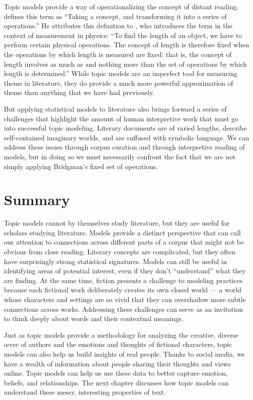 Topic models provide a way of operationalizing the concept of distant reading.
\citet{moretti2013operationalizing} defines this term as ``Taking a concept, and transforming it into a series of operations.''
He attributes this definition to \citet{bridgman1927logic},  who introduces the term in the context of measurement in physics: ``To find the length of an object, we have to perform certain physical operations. The concept of length is therefore fixed when the operations by which length is measured are fixed: that is, the concept of length involves as much as and nothing more than the set of operations by which length is determined.''
While topic models are an imperfect tool for measuring theme in literature, they do provide a much more powerful approximation of theme than anything that we have had previously.

But applying statistical models to literature also brings forward a series of challenges that highlight the amount of human interpretive work that must go into successful topic modeling.
Literary documents are of varied lengths, describe self-contained imaginary worlds, and are suffused with symbolic language.
We can address these issues through corpus curation and through interpretive reading of models, but in doing so we must necessarily confront the fact that we are not simply applying Bridgman's fixed set of operations.

\section{Summary}

Topic models cannot by themselves study literature, but they are useful  for scholars studying literature.
Models provide a distinct perspective that can call our attention to connections across different parts of a corpus that might not be obvious from close reading. Literary concepts are complicated, but they often have surprisingly strong statistical signatures. Models can still be useful in identifying areas of potential interest, even if they don't ``understand'' what they are finding. At the same time, fiction presents a challenge to modeling practices because each fictional work deliberately creates its own closed world --- a world whose characters and settings are so vivid that they can overshadow more subtle connections across works. Addressing these challenges can serve as an invitation to think deeply about words and their contextual meanings.

Just as topic models provide a methodology for analyzing the creative, diverse \oe{}vre of authors and the emotions and thoughts of fictional characters, topic models can also help us build insights of real people.
Thanks to social media, we have a wealth of information about people sharing their thoughts and views online.  Topic models can help us use these data to better capture emotion,
beliefs, and relationships.  The next chapter discusses how topic models can
understand these messy, interesting properties of text.
